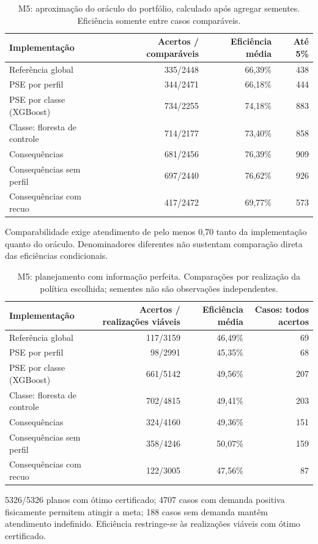 \begin{table}[htbp]\centering\small
\caption{M5: aproximação do oráculo do portfólio, calculado após agregar sementes. Eficiência somente entre casos comparáveis.}
\label{tab:unificado_oraculo_m5}
\begin{tabular}{@{}p{4.4cm}rrr@{}}\toprule
Implementação & Acertos / comparáveis & Eficiência média & Até 5\%\\\midrule
Referência global & 335/2448 & 66,39\% & 438\\
PSE por perfil & 344/2471 & 66,18\% & 444\\
PSE por classe (XGBoost) & 734/2255 & 74,18\% & 883\\
Classe: floresta de controle & 714/2177 & 73,40\% & 858\\
Consequências & 681/2456 & 76,39\% & 909\\
Consequências sem perfil & 697/2440 & 76,62\% & 926\\
Consequências com recuo & 417/2472 & 69,77\% & 573\\
\bottomrule\end{tabular}
\par\footnotesize Comparabilidade exige atendimento de pelo menos 0,70 tanto da implementação quanto do oráculo. Denominadores diferentes não sustentam comparação direta das eficiências condicionais.
\end{table}
\begin{table}[htbp]\centering\small
\caption{M5: planejamento com informação perfeita. Comparações por realização da política escolhida; sementes não são observações independentes.}
\label{tab:unificado_teorico_m5}
\begin{tabular}{@{}p{4.4cm}rrr@{}}\toprule
Implementação & Acertos / realizações viáveis & Eficiência média & Casos: todos acertos\\\midrule
Referência global & 117/3159 & 46,49\% & 69\\
PSE por perfil & 98/2991 & 45,35\% & 68\\
PSE por classe (XGBoost) & 661/5142 & 49,56\% & 207\\
Classe: floresta de controle & 702/4815 & 49,41\% & 203\\
Consequências & 324/4160 & 49,36\% & 151\\
Consequências sem perfil & 358/4246 & 50,07\% & 159\\
Consequências com recuo & 122/3005 & 47,56\% & 87\\
\bottomrule\end{tabular}
\par\footnotesize 5326/5326 planos com ótimo certificado; 4707 casos com demanda positiva fisicamente permitem atingir a meta; 188 casos sem demanda mantêm atendimento indefinido. Eficiência restringe-se às realizações viáveis com ótimo certificado.
\end{table}
